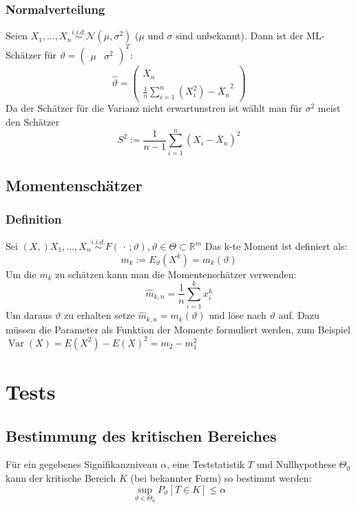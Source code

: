 \documentclass[a4paper,titlepage]{article}
\DeclareMathOperator{\Var}{Var}
\begin{document}
\subsubsection{Normalverteilung}
Seien $X_1, \dots, X_n \overset{i.i.d.}{\sim} \mathcal{N}(\mu,\sigma^2)$ ($\mu$ und $\sigma$ sind unbekannt). Dann ist der ML-Schätzer für $\vartheta=\begin{pmatrix} \mu & \sigma^2 \end{pmatrix}^T$:
\begin{equation*}
\hat{\vartheta} = 
\begin{pmatrix}
\overline{X}_n \\ \frac{1}{n} \sum\limits_{i=1}^n\left(X_i^2\right) -  {\overline{X}_n }^2 
\end{pmatrix}
\end{equation*}
Da der Schätzer für die Varianz nicht erwartunstreu ist wählt man für $\sigma^2$ meist den Schätzer
\begin{equation*}
S^2 := \frac{1}{n-1} \sum_{i=1}^n\left( X_i-\overline{X}_n \right)^2
\end{equation*}

\subsection{Momentenschätzer}
\subsubsection{Definition}
Sei $(X,)X_1,\dots, X_n \overset{i.i.d.}{\sim}F(\,\cdot\,;\vartheta), \vartheta \in \Theta \subset \mathbb{R}^m$
Das k-te Moment ist definiert als:
\begin{equation*}
m_k := E_\vartheta\left(X^k\right)=m_k(\vartheta)
\end{equation*}
Um die $m_k$ zu schätzen kann man die Momentenschätzer verwenden:
\begin{equation*}
\hat{m}_{k,n} = \frac{1}{n}\sum_{i=1}^kx_i^k
\end{equation*}
Um daraus $\vartheta$ zu erhalten setze $\hat{m}_{k,n} = m_k(\vartheta)$ und löse nach $\vartheta$ auf. Dazu müssen die Parameter als Funktion der Momente formuliert werden, zum Beispiel $\Var(X) = E(X^2) - E(X)^2 = m_2 - m_1^2$

\section{Tests}
\subsection{Bestimmung des kritischen Bereiches}
Für ein gegebenes Signifikanzniveau $\alpha$, eine Teststatistik $T$ und Nullhypothese $\Theta_0$ kann der kritische Bereich $K$ (bei bekannter Form) so bestimmt werden:
\begin{equation*}
\sup\limits_{\vartheta \in \Theta_0} P_\vartheta[T \in K] \leq \alpha
\end{equation*}
\end{document}
